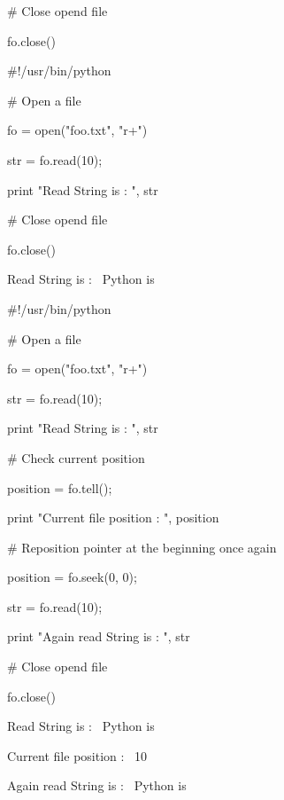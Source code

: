 \documentclass[a4paper,12pt]{report}
\begin{document}
\noindent 
 $  \#  $ Close opend file \par
\noindent 
fo.close() \par
\noindent 
 $  \#  $!/usr/bin/python \par
\vspace{12pt}
\noindent 
 $  \#  $ Open a file \par
\noindent 
fo = open("foo.txt", "r+") \par
\noindent 
str = fo.read(10); \par
\noindent 
print "Read String is : ", str \par
\vspace{12pt}
\noindent 
 $  \#  $ Close opend file \par
\noindent 
fo.close() \par
\vspace{12pt}
\noindent 
Read String is :~ Python is \par
\vspace{16pt}
\noindent 
 $  \#  $!/usr/bin/python \par
\vspace{12pt}
\noindent 
 $  \#  $ Open a file \par
\noindent 
fo = open("foo.txt", "r+") \par
\noindent 
str = fo.read(10); \par
\noindent 
print "Read String is : ", str \par
\vspace{12pt}
\noindent 
 $  \#  $ Check current position \par
\noindent 
position = fo.tell(); \par
\noindent 
print "Current file position : ", position \par
\vspace{12pt}
\noindent 
 $  \#  $ Reposition pointer at the beginning once again \par
\noindent 
position = fo.seek(0, 0); \par
\noindent 
str = fo.read(10); \par
\noindent 
print "Again read String is : ", str \par
\noindent 
 $  \#  $ Close opend file \par
\noindent 
fo.close() \par
\vspace{14pt}
\noindent 
Read String is :~ Python is \par
\noindent 
Current file position :~ 10 \par
\noindent 
Again read String is :~ Python is \par
\end{document}

